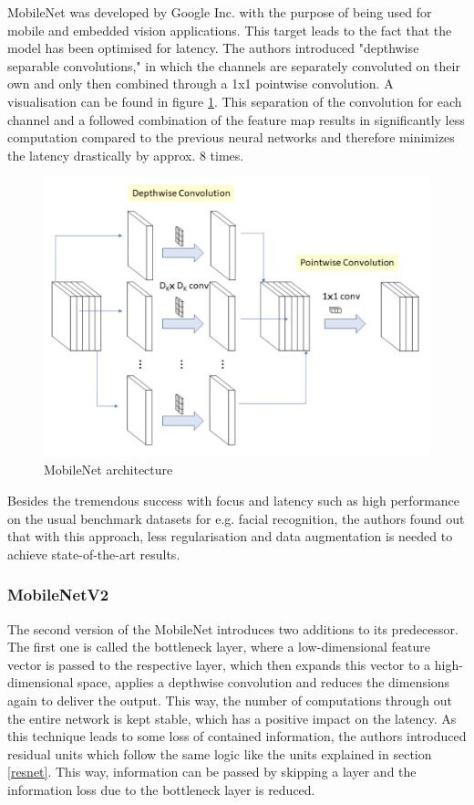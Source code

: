 MobileNet was developed by Google Inc. with the purpose of being used for mobile and embedded vision applications. This target leads to the fact that the model has been optimised for latency.
The authors introduced "depthwise separable convolutions," in which the channels are separately convoluted on their own and only then combined through a 1x1 pointwise convolution\cite{howard2017mobilenets}. A visualisation can be found in figure \ref{fig:mobilenet}. This separation of the convolution for each channel and a followed combination of the feature map results in significantly less computation compared to the previous neural networks and therefore minimizes the latency drastically by approx. 8 times\cite{howard2017mobilenets}.

\begin{figure}[ht]
  \centering
  \includegraphics[width=\linewidth]{figures/mobilenet.png}
  \caption{MobileNet architecture\cite{howard2017mobilenets}}
  \label{fig:mobilenet}
\end{figure}

Besides the tremendous success with focus and latency such as high performance on the usual benchmark datasets for e.g. facial recognition, the authors found out that with this approach, less regularisation and data augmentation is needed to achieve state-of-the-art results.

\subsubsection{MobileNetV2}
The second version of the MobileNet introduces two additions to its predecessor. The first one is called the bottleneck layer, where a low-dimensional feature vector is passed to the respective layer, which then expands this vector to a high-dimensional space, applies a depthwise convolution and reduces the dimensions again to deliver the output\cite{sandler2019mobilenetv2}. This way, the number of computations through out the entire network is kept stable, which has a positive impact on the latency. As this technique leads to some loss of contained information, the authors introduced residual units which follow the same logic like the units explained in section \ref{resnet}. This way, information can be passed by skipping a layer and the information loss due to the bottleneck layer is reduced.

